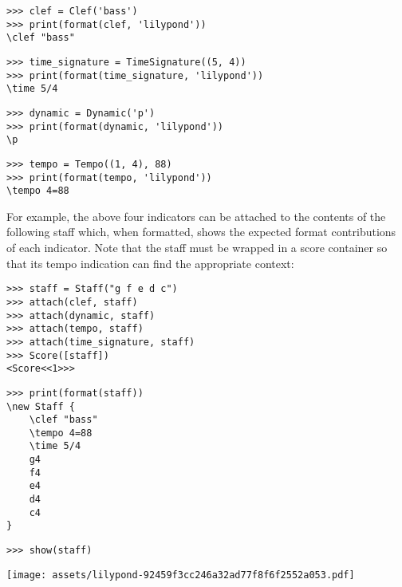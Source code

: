 \begin{abjadbookoutput}
\begin{singlespacing}
\vspace{-0.5\baselineskip}
\begin{lstlisting}
>>> clef = Clef('bass')
>>> print(format(clef, 'lilypond'))
\clef "bass"
\end{lstlisting}
\begin{lstlisting}
>>> time_signature = TimeSignature((5, 4))
>>> print(format(time_signature, 'lilypond'))
\time 5/4
\end{lstlisting}
\begin{lstlisting}
>>> dynamic = Dynamic('p')
>>> print(format(dynamic, 'lilypond'))
\p
\end{lstlisting}
\begin{lstlisting}
>>> tempo = Tempo((1, 4), 88)
>>> print(format(tempo, 'lilypond'))
\tempo 4=88
\end{lstlisting}
\end{singlespacing}
\end{abjadbookoutput}

\noindent For example, the above four indicators can be attached to the
contents of the following staff which, when formatted, shows the expected
format contributions of each indicator. Note that the staff must be wrapped in
a score container so that its tempo indication can find the appropriate
context:

\begin{comment}
<abjad>
staff = Staff("g f e d c")
attach(clef, staff)
attach(dynamic, staff)
attach(tempo, staff)
attach(time_signature, staff)
Score([staff])
print(format(staff))
show(staff)
</abjad>
\end{comment}

\begin{abjadbookoutput}
\begin{singlespacing}
\vspace{-0.5\baselineskip}
\begin{lstlisting}
>>> staff = Staff("g f e d c")
>>> attach(clef, staff)
>>> attach(dynamic, staff)
>>> attach(tempo, staff)
>>> attach(time_signature, staff)
>>> Score([staff])
<Score<<1>>>
\end{lstlisting}
\begin{lstlisting}
>>> print(format(staff))
\new Staff {
    \clef "bass"
    \tempo 4=88
    \time 5/4
    g4
    f4
    e4
    d4
    c4
}
\end{lstlisting}
\begin{lstlisting}
>>> show(staff)
\end{lstlisting}
\noindent\texttt{[image: assets/lilypond-92459f3cc246a32ad77f8f6f2552a053.pdf]}
\end{singlespacing}
\end{abjadbookoutput}

